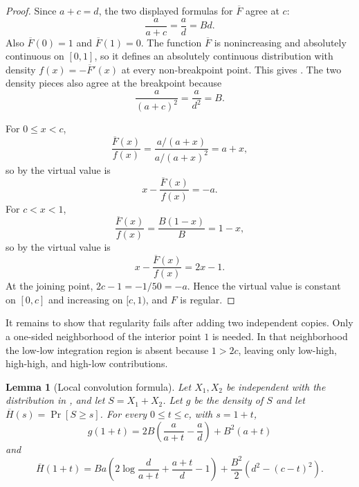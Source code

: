 \documentclass[11pt]{article}
\newtheorem{lemma}{Lemma}[section]
\begin{document}
\begin{proof}
Since $a+c=d$, the two displayed formulas for $\overline F$ agree at $c$:
\[
\frac{a}{a+c}=\frac{a}{d}=Bd.
\]
Also $\overline F(0)=1$ and $\overline F(1)=0$.  The function $\overline F$ is
nonincreasing and absolutely continuous on $[0,1]$, so it defines an
absolutely continuous distribution with density
$f(x)=-\overline F'(x)$ at every non-breakpoint point.  This gives
.  The two density pieces also
agree at the breakpoint because
\[
\frac{a}{(a+c)^2}=\frac{a}{d^2}=B.
\]

For $0\leq x<c$,
\[
\frac{\overline F(x)}{f(x)}
=
\frac{a/(a+x)}{a/(a+x)^2}
=a+x,
\]
so by  the virtual value is
\[
x-\frac{\overline F(x)}{f(x)}=-a.
\]
For $c<x<1$,
\[
\frac{\overline F(x)}{f(x)}
=
\frac{B(1-x)}{B}
=1-x,
\]
so by  the virtual value is
\[
x-\frac{\overline F(x)}{f(x)}=2x-1.
\]
At the joining point, $2c-1=-1/50=-a$.  Hence the virtual value is constant on
$[0,c]$ and increasing on $[c,1)$, and $F$ is regular.
\end{proof}

It remains to show that regularity fails after adding two independent copies.
Only a one-sided neighborhood of the interior point $1$ is needed.  In that
neighborhood the low-low integration region is absent because $1>2c$, leaving
only low-high, high-high, and high-low contributions.

\begin{lemma}[Local convolution formula]
\label{lem:convolution-local-formulas}
Let $X_1,X_2$ be independent with the distribution in
, and let $S=X_1+X_2$.  Let $g$ be the density of
$S$ and let $\overline H(s)=\Pr[S\geq s]$.  For every $0\leq t\leq c$, with
$s=1+t$,
\begin{equation}
\label{eq:local-density}
g(1+t)
=
2B\left(\frac{a}{a+t}-\frac{a}{d}\right)+B^2(a+t)
\end{equation}
and
\begin{equation}
\label{eq:local-survival}
\overline H(1+t)
=
Ba\left(2\log\frac{d}{a+t}+\frac{a+t}{d}-1\right)
+\frac{B^2}{2}\left(d^2-(c-t)^2\right).
\end{equation}
\end{lemma}
\end{document}

